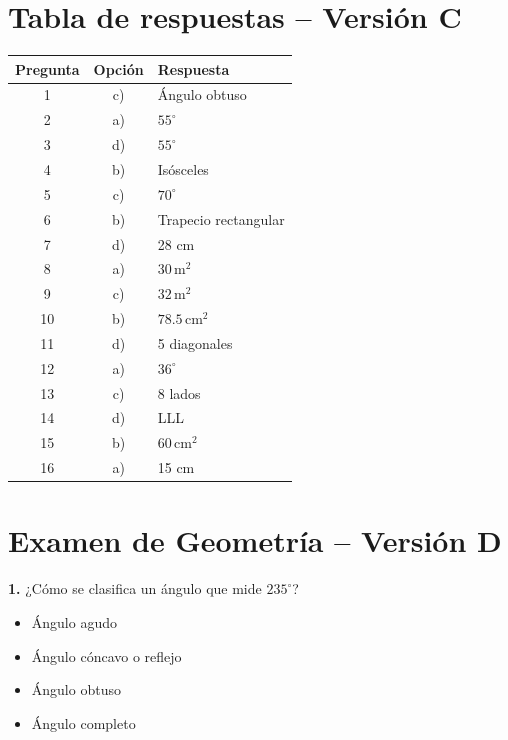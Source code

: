 \newpage

\section*{Tabla de respuestas -- Versión C}

\begin{center}
\begin{tabular}{|c|c|l|}
\hline
\textbf{Pregunta} & \textbf{Opción} & \textbf{Respuesta} \\ \hline
1  & c) & Ángulo obtuso \\ \hline
2  & a) & $55^\circ$ \\ \hline
3  & d) & $55^\circ$ \\ \hline
4  & b) & Isósceles \\ \hline
5  & c) & $70^\circ$ \\ \hline
6  & b) & Trapecio rectangular \\ \hline
7  & d) & 28 cm \\ \hline
8  & a) & $30\,\text{m}^2$ \\ \hline
9  & c) & $32\,\text{m}^2$ \\ \hline
10 & b) & $78.5\,\text{cm}^2$ \\ \hline
11 & d) & 5 diagonales \\ \hline
12 & a) & $36^\circ$ \\ \hline
13 & c) & 8 lados \\ \hline
14 & d) & LLL \\ \hline
15 & b) & $60\,\text{cm}^2$ \\ \hline
16 & a) & 15 cm \\ \hline
\end{tabular}
\end{center}

\newpage

\section*{Examen de Geometría -- Versión D}

\noindent\textbf{1.} ¿Cómo se clasifica un ángulo que mide $235^\circ$?

\begin{itemize}
    \item[a)] Ángulo agudo
    \item[b)] Ángulo cóncavo o reflejo
    \item[c)] Ángulo obtuso
    \item[d)] Ángulo completo
\end{itemize}



